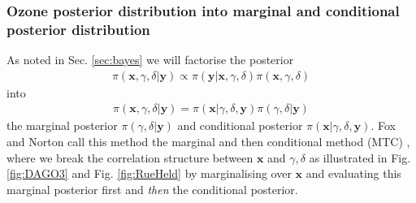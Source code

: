 \subsubsection{Ozone posterior distribution into marginal and conditional posterior distribution}
\label{subsec:MTC}
As noted in Sec. \ref{sec:bayes} we will factorise the posterior
\begin{align}
	\pi( \bm{x}, \gamma, \delta| \bm{y}) \propto \pi(\bm{y}| \bm{x}, \gamma, \delta) \pi( \bm{x}, \gamma, \delta)
\end{align}
into 
\begin{align}
	\pi( \bm{x}, \gamma, \delta| \bm{y}) =\pi( \bm{x}|\gamma, \delta, \bm{y})\pi(\gamma, \delta | \bm{y})
\end{align}
the marginal posterior $\pi(\gamma, \delta | \bm{y})$ and conditional posterior $\pi( \bm{x}|\gamma, \delta, \bm{y})$.
Fox and Norton call this method the marginal and then conditional method (MTC) \cite{fox2016fast}, where we break the correlation structure between $\bm{x}$ and $\gamma, \delta$ as illustrated in Fig. \ref{fig:DAGO3} and Fig. \ref{fig:RueHeld} by marginalising over $\bm{x}$ and evaluating this marginal posterior first and \textit{then} the conditional posterior.

